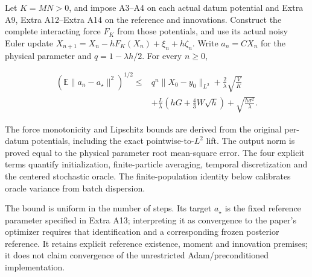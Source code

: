 \documentclass[11pt,a4paper]{report}
\begin{document}
Let \(K=MN>0\), and impose A3–A4 on each actual datum potential and Extra A9, Extra A12–Extra A14 on the reference and innovations. Construct the complete interacting force \(F_K\) from those potentials, and use its actual noisy Euler update \(X_{n+1}=X_n-hF_K(X_n)+\xi_n+h\zeta_n\). Write \(a_n=CX_n\) for the physical parameter and \(q=1-\lambda h/2\). For every \(n\ge0\),



\[\begin{aligned}\left(\mathbb E\|a_n-a_\star\|^2\right)^{1/2}\le{}&q^n\|X_0-y_0\|_{L^2}+\frac2\lambda\sqrt{\frac VK}\\&+\frac L\lambda\left(hG+\frac43W\sqrt h\right)+\sqrt{\frac{h\sigma^2}{\lambda}}.\end{aligned}\]



The force monotonicity and Lipschitz bounds are derived from the original per-datum potentials, including the exact pointwise-to-\(L^2\) lift. The output norm is proved equal to the physical parameter root mean-square error. The four explicit terms quantify initialization, finite-particle averaging, temporal discretization and the centered stochastic oracle. The finite-population identity below calibrates oracle variance from batch dispersion.




The bound is uniform in the number of steps. Its target \(a_\star\) is the fixed reference parameter specified in Extra A13; interpreting it as convergence to the paper's optimizer requires that identification and a corresponding frozen posterior reference. It retains explicit reference existence, moment and innovation premises; it does not claim convergence of the unrestricted Adam/\allowbreak{}preconditioned implementation.
\end{document}
